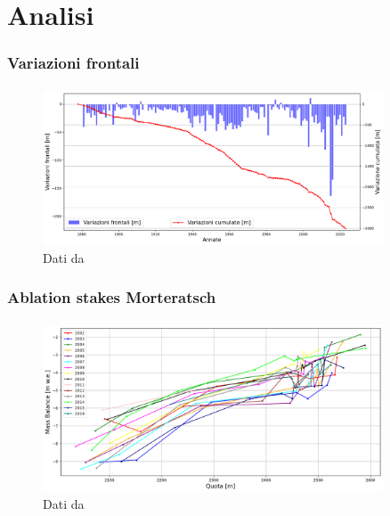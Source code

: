 \section{Analisi}


\begin{frame}
    \frametitle{Variazioni frontali}
    \framesubtitle{}

    \begin{figure}
        \includegraphics[width=0.9\textwidth]{Immagini/variazioniSovrapposte.png}
        \caption{Dati da \cite{GLAMOS23}}
    \end{figure}
  
\end{frame}


\begin{frame}
    \frametitle{Ablation stakes Morteratsch}
    \framesubtitle{}

    \begin{figure}
        \includegraphics[width=0.9\textwidth]{Immagini/annateMassBalanceMorteratsch.png}
        \caption{Dati da \cite{STAT2018}}
    \end{figure}
  
\end{frame}


